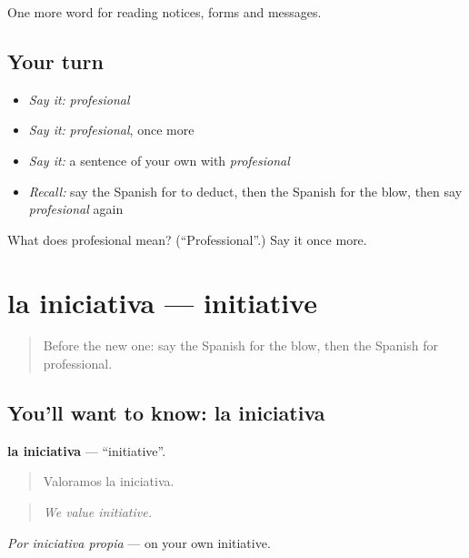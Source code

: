 \begin{grammarlens}[title={What you've built}]
One more word for reading notices, forms and messages.
\end{grammarlens}

\subsection*{Your turn}
\begin{itemize}
\raggedright
  \item \emph{Say it:} \emph{profesional}
  \item \emph{Say it:} \emph{profesional}, once more
  \item \emph{Say it:} a sentence of your own with \emph{profesional}
  \item \emph{Recall:} say the Spanish for to deduct, then the Spanish for the blow, then say \emph{profesional} again
\end{itemize}

\begin{tcolorbox}[breakable,colback=teal!4,colframe=teal!35!black,title={Before you move on}]
What does profesional mean? (\textquotedblleft{}Professional\textquotedblright{}.) Say it once more.
\end{tcolorbox}
\section[la iniciativa]{la iniciativa — initiative}

\label{lesson:ES-C475-iniciativa}



\begin{quote}
Before the new one: say the Spanish for the blow, then the Spanish for professional.
\end{quote}

\subsection*{You'll want to know: la iniciativa}
\textbf{la iniciativa} — \textquotedblleft{}initiative\textquotedblright{}.

\begin{quote}
Valoramos la iniciativa.
\end{quote}

\begin{quote}
\emph{We value initiative.}
\end{quote}

\emph{Por iniciativa propia} — on your own initiative.

